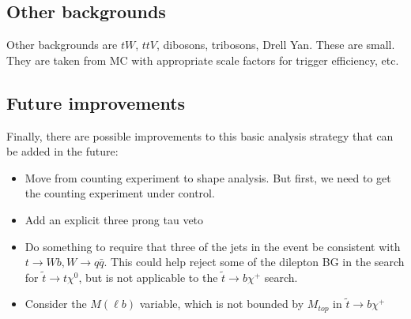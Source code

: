 

\subsection{Other backgrounds}
\label{sec:other-general}
Other backgrounds are $tW$, $ttV$, dibosons, tribosons, Drell Yan.
These  are small.  They are taken from MC with appropriate scale
factors
for trigger efficiency, etc.


\subsection{Future improvements}
\label{sec:improvements-general}
Finally, there are possible improvements to this basic analysis strategy that can be added in the future:
\begin{itemize}
\item Move from counting experiment to shape analysis.  But first, we need to get the counting
experiment under control.
\item Add an explicit three prong tau veto
\item Do something to require that three of the jets in the event be consistent with $t \to Wb, W \to q\bar{q}$.
This could help reject some of the dilepton BG in the search for $\widetilde{t} \to t \chi^0$, 
but is not applicable to the $\widetilde{t} \to b \chi^+$ search.
\item Consider the $M(\ell b)$ variable, which is not bounded by $M_{top}$ in $\widetilde{t} \to b \chi^+$
\end{itemize}
